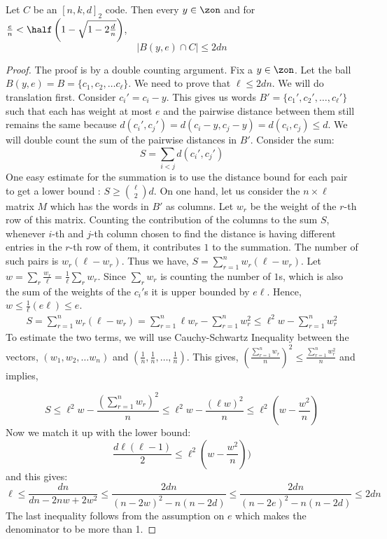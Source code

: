 \begin{theorem}
Let $C$ be an $[n,k,d]_2$ code. Then every $y \in \zon$ and for $\frac{e}{n} < \half\left( 1-\sqrt{1-2\frac{d}{n}}\right)$, 
$$|B(y,e) \cap C| \le 2dn$$
\end{theorem}
\begin{proof}
The proof is by a double counting argument. Fix a $y \in \zon$. Let the ball $B(y,e) = B = \{c_1, c_2, \ldots c_\ell \}$. We need to prove that $\ell \le 2dn$. We will do translation first. Consider $c_i' = c_i - y$. This gives us words $B' = \{ c_1', c_2', \ldots, c_\ell' \}$ such that each has weight at most $e$ and the pairwise distance between them still remains the same because $d(c_i',c_j') = d(c_i-y,c_j-y)=d(c_i,c_j) \le d$. We will double count the sum of the pairwise distances in $B'$. Consider the sum:
$$S = \sum_{i < j} d(c_i',c_j')$$
One easy estimate for the summation is to use the distance bound for each pair to get a lower bound : $S \ge {\ell \choose 2}d$.
On one hand, let us consider the $n \times \ell$ matrix $M$ which has the words in $B'$ as columns. Let $w_r$ be the weight of the $r$-th row of this matrix. Counting the contribution of the columns to the sum $S$, whenever $i$-th and $j$-th column chosen to find the distance is having different entries in the $r$-th row of them, it contributes $1$ to the summation. The number of such pairs is $w_r(\ell-w_r)$. Thus we have, $S = \sum_{r=1}^n w_r(\ell-w_r)$. Let $w = \sum_r \frac{w_r}{\ell} = \frac{1}{\ell}\sum_r w_r$. Since $\sum_r w_r$ is counting the number of $1$s, which is also the sum of the weights of the $c_i'$s it is upper bounded by $e\ell$. Hence, $w \le \frac{1}{\ell}(e\ell) \le e$.
\begin{eqnarray*}
S = \sum_{r=1}^n w_r(\ell-w_r) = \sum_{r=1}^n \ell w_r-\sum_{r=1}^n w_r^2 \le \ell^2 w-\sum_{r=1}^n w_r^2
\end{eqnarray*}
To estimate the two terms, we will use Cauchy-Schwartz Inequality between the vectors, $(w_1, w_2, \ldots w_n)$ and $\left( \frac{1}{n}, \frac{1}{n}, \ldots, \frac{1}{n} \right)$. This gives,
$\left(\frac{\sum_{r=1}^n w_r}{n}\right)^2 \le \frac{\sum_{r=1}^n w_r^2}{n}$ and implies,

$$ S \le \ell^2w - \frac{\left(\sum_{r=1}^n w_r\right)^2}{n} \le \ell^2w - \frac{(\ell w)^2}{n} \le \ell^2\left(w -\frac{w^2}{n}\right)$$
Now we match it up with the lower bound:
$$ \frac{d\ell(\ell-1)}{2} \le \ell^2\left(w - \frac{w^2}{n}\right))$$
and this gives:
$$\ell \le \frac{dn}{dn-2nw+2w^2} \le \frac{2dn}{(n-2w)^2-n(n-2d)}
\le \frac{2dn}{(n-2e)^2-n(n-2d)}
\le 2dn$$
The last inequality follows from the assumption on $e$ which makes the denominator to be more than 1.
\end{proof}

